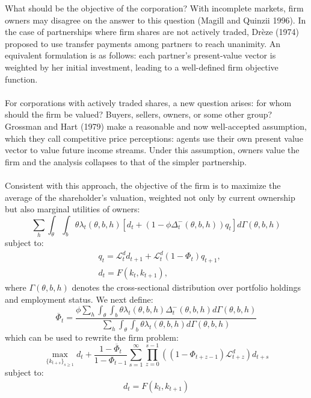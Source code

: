\documentclass[12pt,letterpaper]{article}
\begin{document}
What should be the objective of the corporation? With incomplete markets, firm owners may disagree on the answer to this question (Magill and Quinzii 1996). In the case of partnerships where firm shares are not actively traded, Dr\`eze (1974) proposed to use transfer payments among partners to reach unanimity. An equivalent formulation is as follows: each partner's present-value vector is weighted by her initial investment, leading to a well-defined firm objective function.\\\\
For corporations with actively traded shares, a new question arises: for whom should the firm be valued? Buyers, sellers, owners, or some other group? Grossman and Hart (1979) make a reasonable and now well-accepted  assumption, which they call competitive price perceptions: agents use their own present value vector to value future income streams. Under this assumption, owners value the firm and the analysis collapses to that of the simpler partnership.\\\\
Consistent with this approach, the objective of the firm is to maximize the average of the shareholder's valuation, weighted not only by current ownership but also marginal utilities of owners:
\begin{equation*}
    \sum_h\int_\theta\int_b\theta\lambda_t(\theta,b,h)[d_t+(1-\phi \Delta_t^-(\theta,b,h))q_t]d\Gamma(\theta,b,h)
\end{equation*}
subject to:
\begin{align*}
    &q_t=\mathcal{L}^d_td_{t+1}+\mathcal{L}^d_t(1-\Phi_t)q_{t+1},\\
    &d_t=F(k_t,k_{t+1}),
\end{align*}
where $\Gamma(\theta,b,h)$ denotes the cross-sectional distribution over portfolio holdings and employment status. We next define:
\begin{equation*}
    \overline{\Phi}_t=\frac{\phi\sum_h\int_\theta\int_b\theta\lambda_t(\theta,b,h) \Delta_t^-(\theta,b,h)d\Gamma(\theta,b,h)}{\sum_h\int_\theta\int_b\theta\lambda_t(\theta,b,h) d\Gamma(\theta,b,h)}
\end{equation*}which can be used to rewrite the firm problem:
\begin{equation*}
    \max_{\{k_{t+s}\}_{s\geq1}}d_t+\frac{1-\overline{\Phi}_t}{1-\Phi_{t-1}}\sum_{s=1}^\infty \prod_{z=0}^{s-1}((1-\Phi_{t+z-1})\mathcal{L}^d_{t+z})d_{t+s}
\end{equation*}
subject to:
\begin{align*}
    d_t=F(k_t,k_{t+1})
\end{align*}
\end{document}
